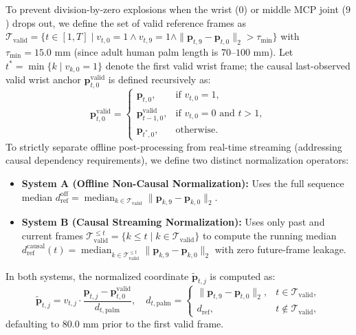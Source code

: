 \documentclass[10pt,twocolumn]{article}
\begin{document}
To prevent division-by-zero explosions when the wrist ($0$) or middle MCP joint ($9$) drops out, we define the set of valid reference frames as $\mathcal{T}_{\text{valid}} = \{t \in [1, T] \mid v_{t,0}=1 \land v_{t,9}=1 \land \|\mathbf{p}_{t,9}-\mathbf{p}_{t,0}\|_2 > \tau_{\min}\}$ with $\tau_{\min} = 15.0\text{ mm}$ (since adult human palm length is $70\text{--}100\text{ mm}$). Let $t^* = \min\{k \mid v_{k,0}=1\}$ denote the first valid wrist frame; the causal last-observed valid wrist anchor $\mathbf{p}_{t,0}^{\text{valid}}$ is defined recursively as:
\begin{equation}
    \mathbf{p}_{t,0}^{\text{valid}} = \begin{cases} 
    \mathbf{p}_{t,0}, & \text{if } v_{t,0} = 1, \\
    \mathbf{p}_{t-1,0}^{\text{valid}}, & \text{if } v_{t,0} = 0 \text{ and } t > 1, \\
    \mathbf{p}_{t^*,0}, & \text{otherwise.}
    \end{cases}
    \label{eq:valid_wrist}
\end{equation}
To strictly separate offline post-processing from real-time streaming (addressing causal dependency requirements), we define two distinct normalization operators:
\begin{itemize}
    \item \textbf{System A (Offline Non-Causal Normalization):} Uses the full sequence median $d_{\text{ref}}^{\text{off}} = \operatorname{median}_{k \in \mathcal{T}_{\text{valid}}} \|\mathbf{p}_{k,9} - \mathbf{p}_{k,0}\|_2$.
    \item \textbf{System B (Causal Streaming Normalization):} Uses only past and current frames $\mathcal{T}_{\text{valid}}^{\le t} = \{k \le t \mid k \in \mathcal{T}_{\text{valid}}\}$ to compute the running median $d_{\text{ref}}^{\text{causal}}(t) = \operatorname{median}_{k \in \mathcal{T}_{\text{valid}}^{\le t}} \|\mathbf{p}_{k,9} - \mathbf{p}_{k,0}\|_2$ with zero future-frame leakage.
\end{itemize}
In both systems, the normalized coordinate $\tilde{\mathbf{p}}_{t,j}$ is computed as:
\begin{equation}
    \tilde{\mathbf{p}}_{t,j} = v_{t,j} \cdot \frac{\mathbf{p}_{t,j} - \mathbf{p}_{t,0}^{\text{valid}}}{d_{t,\text{palm}}}, \quad d_{t,\text{palm}} = \begin{cases} \|\mathbf{p}_{t,9}-\mathbf{p}_{t,0}\|_2, & t \in \mathcal{T}_{\text{valid}}, \\ d_{\text{ref}}, & t \notin \mathcal{T}_{\text{valid}}, \end{cases}
    \label{eq:l2norm}
\end{equation}
defaulting to $80.0\text{ mm}$ prior to the first valid frame.
\end{document}
